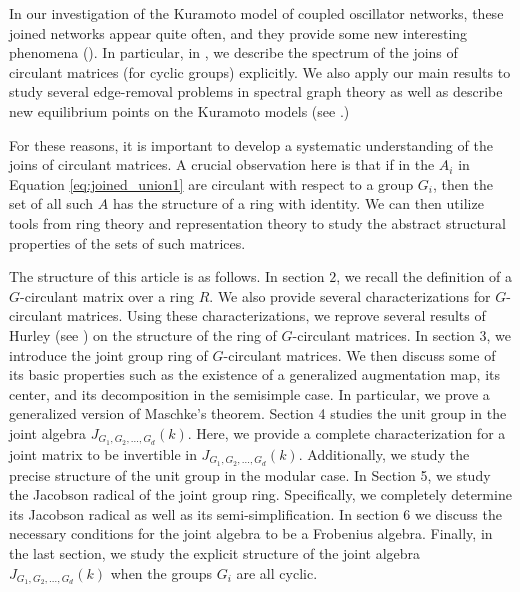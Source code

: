 \documentclass[12pt, a4paper]{amsart}
\numberwithin{equation}{section} %
\theoremstyle{plain}
\theoremstyle{definition}
\theoremstyle{plain}
\theoremstyle{remark}
\begin{document}
In our investigation of the Kuramoto model of coupled oscillator networks, these joined networks appear quite often, and they provide some new interesting phenomena (\cite{ko3, ko4, CM1}). In particular, in \cite{CM1}, we describe the spectrum of the joins of circulant matrices (for cyclic groups) explicitly. We also apply our main results to study several edge-removal problems in spectral graph theory as well as describe new equilibrium points on the Kuramoto models (see \cite[Section 4, Section 5]{CM1}.)




For these reasons, it is important to develop a systematic understanding of the joins of circulant matrices. A crucial observation here is that if in the $A_i$ in Equation \ref{eq:joined_union1} are circulant with respect to a group $G_i$, then the set of all such $A$ has the structure of a ring with identity. We can then utilize tools from ring theory and representation theory to study the abstract structural properties of the sets of such matrices. 


The structure of this article is as follows. In section $2$, we recall the definition of a $G$-circulant matrix over a ring $R.$ We also provide several characterizations for $G$-circulant matrices. Using these characterizations, we reprove several results of Hurley (see \cite{hurley2006}) on the structure of the ring of $G$-circulant matrices. In section 3, we introduce the joint group ring of $G$-circulant matrices. We then discuss some of its basic properties such as the existence of a generalized augmentation map, its center, and its decomposition in the semisimple case. In particular, we prove a generalized version of Maschke's theorem. Section 4 studies the unit group in the joint algebra $J_{G_1, G_2, \ldots, G_d}(k)$. Here, we provide a complete characterization for a joint matrix to be invertible in $J_{G_1, G_2, \ldots, G_d}(k).$ Additionally, we study the precise structure of the unit group in the modular case. In Section 5, we study the Jacobson radical of the joint group ring. Specifically, we completely determine its Jacobson radical as well as its semi-simplification. In section 6 we discuss the necessary conditions for the joint algebra to be a Frobenius algebra. Finally, in the last section, we study the explicit structure of the joint algebra $J_{G_1, G_2, \ldots, G_d}(k)$ when the groups $G_i$ are all cyclic. 
\end{document}
